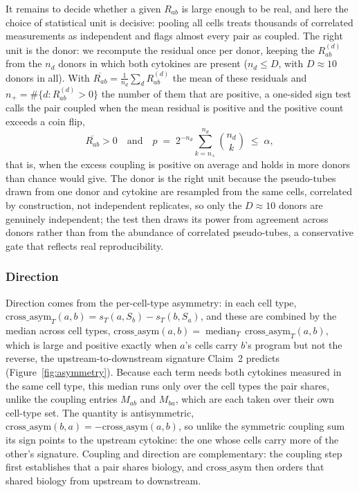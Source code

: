 \documentclass[11pt,a4paper]{article}
\newcommand{\rev}[1]{#1}  %
\begin{document}
\rev{It remains to decide whether a given $R_{ab}$ is large enough to be real, and here the choice of statistical unit is decisive: pooling all cells treats thousands of correlated measurements as independent and flags almost every pair as coupled.}
\rev{The right unit is the donor: we recompute the residual once per donor, keeping the $R_{ab}^{(d)}$ from the $n_d$ donors in which both cytokines are present ($n_d\le D$, with $D\approx10$ donors in all). With $\overline{R_{ab}}=\frac{1}{n_d}\sum_d R_{ab}^{(d)}$ the mean of these residuals and $n_+=\#\{d:R_{ab}^{(d)}>0\}$ the number of them that are positive, a one-sided sign test calls the pair coupled when the mean residual is positive and the positive count exceeds a coin flip,
\[
  \overline{R_{ab}}>0 \quad\text{and}\quad p \;=\; 2^{-n_d}\sum_{k=n_+}^{n_d}\binom{n_d}{k}\;\le\;\alpha,
\]
that is, when the excess coupling is positive on average and holds in more donors than chance would give.}
\rev{The donor is the right unit because the pseudo-tubes drawn from one donor and cytokine are resampled from the same cells, correlated by construction, not independent replicates, so only the $D\approx10$ donors are genuinely independent; the test then draws its power from agreement across donors rather than from the abundance of correlated pseudo-tubes, a conservative gate that reflects real reproducibility.}


\subsubsection{Direction}
\label{sec:direction-stat}
Direction comes from the per-cell-type asymmetry: in each cell type, $\mathrm{cross\_asym}_T(a,b)=s_T(a,S_b)-s_T(b,S_a)$, and these are combined by the median across cell types, $\mathrm{cross\_asym}(a,b)=\operatorname*{median}_{T}\,\mathrm{cross\_asym}_T(a,b)$, which is large and positive exactly when $a$'s cells carry $b$'s program but not the reverse, the upstream-to-downstream signature Claim~2 predicts \rev{(Figure~\ref{fig:asymmetry})}.
Because each term needs both cytokines measured in the same cell type, this median runs only over the cell types the pair shares, unlike the coupling entries $M_{ab}$ and $M_{ba}$, which are each taken over their own cell-type set.
The quantity is antisymmetric, $\mathrm{cross\_asym}(b,a)=-\mathrm{cross\_asym}(a,b)$, so unlike the symmetric coupling sum its sign points to the upstream cytokine: the one whose cells carry more of the other's signature.
Coupling and direction are complementary: the coupling step first establishes that a pair shares biology, and $\mathrm{cross\_asym}$ then orders that shared biology from upstream to downstream.
\end{document}
